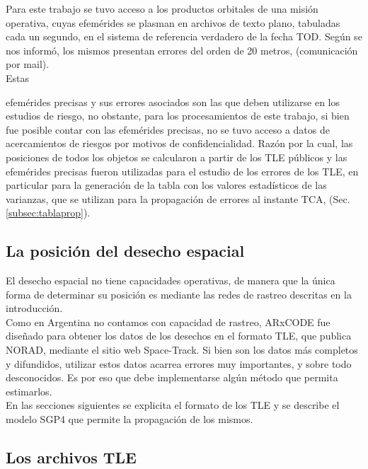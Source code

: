 Para este trabajo se tuvo acceso a los productos orbitales de una misi\'on operativa, cuyas efem\'erides se plasman en archivos de texto plano, tabuladas cada un segundo, en el sistema de referencia verdadero de la fecha \ac{TOD}. Seg\'un se nos inform\'o, los mismos presentan errores del orden de  20 metros, (comunicaci\'on por mail).\\

Estas {efem\'erides precisas y sus errores asociados son las que deben utilizarse en los estudios de riesgo, no obstante, para los procesamientos de este trabajo, si bien fue posible contar con las efem\'erides precisas, no se tuvo acceso a datos de acercamientos de riesgos por motivos de confidencialidad. Raz\'on por la cual, las posiciones de todos los objetos se calcularon a partir de los TLE p\'ublicos y las efem\'erides precisas fueron utilizadas para el estudio de los errores de los TLE, en particular para la generaci\'on de la tabla con los valores estad\'isticos de las varianzas, que se utilizan para la propagaci\'on de errores al instante TCA, (Sec. \ref{subsec:tablaprop}). \\

\subsection{La posici\'on del desecho espacial}
El desecho espacial no tiene capacidades operativas, de manera que la \'unica forma de determinar su posici\'on es mediante las redes de rastreo descritas en la introducci\'on.\\

Como en Argentina no contamos con capacidad de rastreo, ARxCODE fue dise\~nado para obtener los datos de los desechos en el formato TLE, que publica NORAD, mediante el sitio web Space-Track.
Si bien son los datos m\'as completos y difundidos, utilizar estos datos acarrea errores muy importantes, y sobre todo desconocidos. Es por eso que debe implementarse alg\'un m\'etodo que permita estimarlos.\\

En las secciones siguientes se explicita el formato de los TLE y se describe el modelo SGP4 que permite la propagaci\'on de los mismos.\\

\subsection{Los archivos TLE}\label{subsec:tleformat}

}
